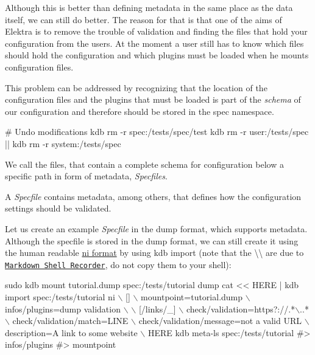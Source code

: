 Although this is better than defining metadata in the same place as the data itself, we can still do better. The reason for that is that one of the aims of Elektra is to remove the trouble of validation and finding the files that hold your configuration from the users. At the moment a user still has to know which files should hold the configuration and which plugins must be loaded when he mounts configuration files.

This problem can be addressed by recognizing that the location of the configuration files and the plugins that must be loaded is part of the {\itshape schema} of our configuration and therefore should be stored in the spec namespace.


\begin{DoxyCode}
# Undo modifications
kdb rm -r spec:/tests/spec/test
kdb rm -r user:/tests/spec || kdb rm -r system:/tests/spec
\end{DoxyCode}


We call the files, that contain a complete schema for configuration below a specific path in form of metadata, {\itshape Specfiles}.

A {\itshape Specfile} contains metadata, among others, that defines how the configuration settings should be validated.

Let us create an example {\itshape Specfile} in the dump format, which supports metadata. Although the specfile is stored in the dump format, we can still create it using the human readable \hyperlink{autotoc_md475_src_plugins_ni_README_md}{ni format} by using {\ttfamily kdb import} (note that the {\ttfamily \textbackslash{}\textbackslash{}} are due to \href{https://master.libelektra.org/tests/shell/shell_recorder/tutorial_wrapper}{\tt Markdown Shell Recorder}, do not copy them to your shell)\+:


\begin{DoxyCode}
sudo kdb mount tutorial.dump spec:/tests/tutorial dump
cat << HERE | kdb import spec:/tests/tutorial ni  \(\backslash\)
[]                                         \(\backslash\)
 mountpoint=tutorial.dump                \(\backslash\)
 infos/plugins=dump validation           \(\backslash\)
                                           \(\backslash\)
[/links/\_]                                 \(\backslash\)
check/validation=https?://.*\(\backslash\)..*         \(\backslash\)
check/validation/match=LINE              \(\backslash\)
check/validation/message=not a valid URL \(\backslash\)
description=A link to some website       \(\backslash\)
HERE
kdb meta-ls spec:/tests/tutorial
#> infos/plugins
#> mountpoint
\end{DoxyCode}


